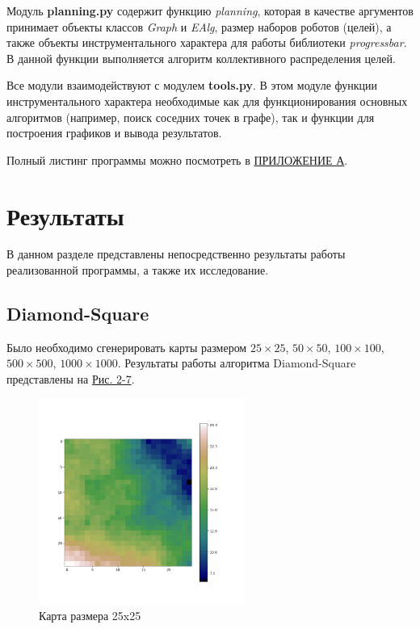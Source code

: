 \documentclass{article}
\numberwithin{equation}{section}
\begin{document}
		Модуль \textbf{planning.py} содержит функцию \textit{planning}, которая в качестве аргументов принимает объекты классов \textit{Graph} и \textit{EAlg}, размер наборов роботов (целей), а также объекты инструментального характера для работы библиотеки \textit{progressbar}. В данной функции выполняется алгоритм коллективного распределения целей.

		Все модули взаимодействуют с модулем \textbf{tools.py}. В этом модуле функции инструментального характера необходимые как для функционирования основных алгоритмов (например, поиск соседних точек в графе), так и функции для построения графиков и вывода результатов.

		Полный листинг программы можно посмотреть в \hyperref[sec:code]{ПРИЛОЖЕНИЕ А}.

	\newpage
	\section{Результаты}

	В данном разделе представлены непосредственно результаты работы реализованной программы, а также их исследование.
		\subsection{Diamond-Square}

		Было необходимо сгенерировать карты размером $25 \times 25$,
		$50 \times 50$, $100 \times 100$, $500 \times 500$, $1000 \times 1000$. Результаты работы алгоритма Diamond-Square представлены на \hyperref[fig:map25]{Рис. 2-7}.
			\begin{figure}[H]
				\centering
				\vspace{-0.5cm}
				\includegraphics[width=0.6\textwidth]{data/maps_example/25x25.png}
				\vspace{-0.5cm}
				\caption{Карта размера 25x25}\label{fig:map25}
			\end{figure}
\end{document}
